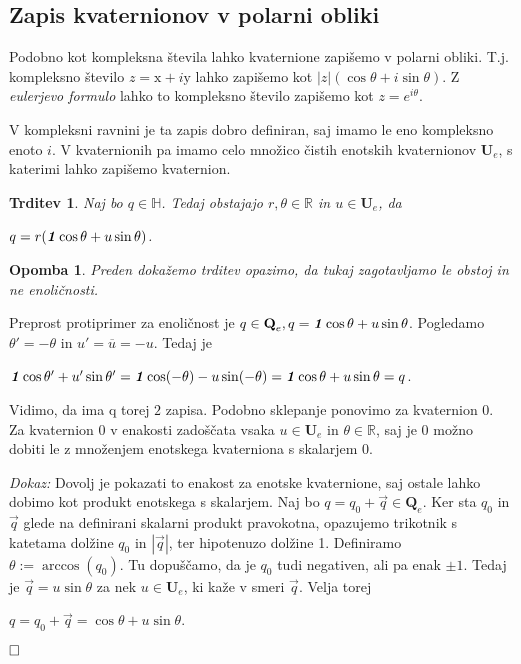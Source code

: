 \documentclass[a4paper,12pt]{article}
\def\R{\mathbb{R}} %
\def\H{\mathbb{H}} %
\def\Qe{\textbf{Q}_{e}} %
\def\Ue{\textbf{U}_{e}} %
\def\1{\textbf{\emph{1}}}
\newcommand{\conj}[1]{\overline{#1}}
\def\qed{$\hfill\Box$}   %
\newtheorem{trditev}{Trditev}
\newtheorem{opomba}{Opomba}
\begin{document}
\subsection{Zapis  kvaternionov v polarni obliki}

Podobno kot kompleksna števila lahko kvaternione zapišemo v polarni obliki. T.j.
kompleksno število $z = \text{x} + i\text{y}$ lahko zapišemo kot $|z|( \cos\theta + i\sin\theta )$. Z \emph{eulerjevo formulo} lahko to kompleksno število
zapišemo kot $z = e^{i\theta}$.

V kompleksni ravnini je ta zapis dobro definiran, saj imamo le eno kompleksno enoto $i$.
V kvaternionih pa imamo celo množico čistih enotskih kvaternionov $\Ue$, s katerimi lahko zapišemo kvaternion.

\begin{trditev}
Naj bo $q \in \H$. Tedaj obstajajo $r, \theta \in \R$ in $u \in \Ue$, da
\begin{center}
   $q = r (\1\cos\theta + u\sin\theta)$.
\end{center}
\end{trditev}

\begin{opomba}
Preden dokažemo trditev opazimo, da tukaj zagotavljamo \emph{le obstoj} in ne enoličnosti.

\end{opomba}
Preprost protiprimer za enoličnost je $q \in \Qe, q = \1\cos\theta + u\sin\theta$.
Pogledamo $\theta' = -\theta$ in $u' = \conj{u} = -u$. Tedaj je
\begin{center}
   $\1\cos\theta' + u'\sin\theta' = \1\cos(-\theta) -u\sin(-\theta) = \1\cos\theta + u\sin\theta = q$.
\end{center}
Vidimo, da ima q torej $2$ zapisa. Podobno sklepanje ponovimo za kvaternion 0. Za kvaternion 0 v enakosti zadoščata vsaka $u \in \Ue$ in $\theta \in \R$, saj je 0 možno dobiti le z množenjem enotskega kvaterniona
s skalarjem 0.

\noindent
{\em Dokaz: \/}Dovolj je pokazati to enakost za enotske kvaternione, saj ostale lahko dobimo kot produkt enotskega s skalarjem.
Naj bo $q = q_{0} + \vec{q} \in \Qe$. Ker sta $q_{0}$ in $\vec{q}$ glede na definirani skalarni produkt pravokotna, opazujemo trikotnik s katetama dolžine $q_{0}$ in $|\vec{q}|$, ter hipotenuzo dolžine 1.
Definiramo $\theta := \arccos(q_{0})$. Tu dopuščamo, da je $q_{0}$ tudi negativen, ali pa enak $\pm 1$. Tedaj je $\vec{q} = u\sin\theta$ za nek $u \in \Ue$, ki kaže v smeri $\vec{q}$.
Velja torej
\begin{center}
   $q = q_{0} + \vec{q} = \cos\theta + u\sin\theta$.
\end{center}
\qed
\end{document}
